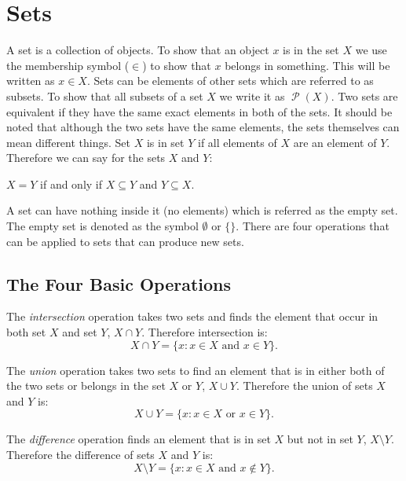 \documentclass[11pt,a4paper, notitlepage]{report}
\DeclareMathOperator{\power}{\mathcal{P}}
\begin{document}
\section{Sets}
\label{sec:sets}

A set is a collection of objects. To show that an object $x$ is in the set $X$ we use the membership symbol ($\in$) to show that $x$ belongs in something. This will be written as $x \in X$. Sets can be elements of other sets which are referred to as subsets. To show that all subsets of a set $X$ we write it as $\power(X)$. Two sets are equivalent if they have the same exact elements in both of the sets. It should be noted that although the two sets have the same elements, the sets themselves can mean different things. Set $X$ is in set $Y$ if all elements of $X$ are an element of $Y$.
Therefore we can say for the sets $X$ and $Y$:
\begin{center}
  $X=Y$ if and only if $X \subseteq Y$ and $Y \subseteq X$.
\end{center}
A set can have nothing inside it (no elements) which is referred as the empty set. The empty set is denoted as the symbol $\emptyset$ or $\{\}$. There are four operations that can be applied to sets that can produce new sets.

\subsection{The Four Basic Operations}
\label{sec:fourbasop}

The \emph{intersection} operation takes two sets and finds the element that occur in both set $X$ and set $Y$, $X \cap Y$. Therefore intersection is:
\begin{displaymath}
  X \cap Y = \{x : x \in X  \text{ and } x \in Y\}.
\end{displaymath}

The \emph{union} operation takes two sets to find an element that is in either both of the two sets or belongs in the set $X$ or $Y$, $X \cup Y$. Therefore the union of sets $X$ and $Y$ is:
\begin{displaymath}
  X \cup Y = \{x : x \in X  \text{ or } x \in Y\}.
\end{displaymath}

The \emph{difference} operation finds an element that is in set $X$ but not in set $Y$, $X \setminus Y$. Therefore the difference of sets $X$ and $Y$ is:
\begin{displaymath}
  X \setminus Y = \{x : x \in X  \text{ and } x \notin Y\}.
\end{displaymath}
\end{document}

